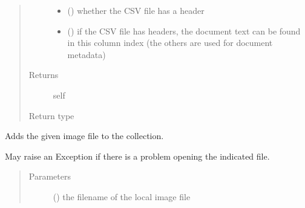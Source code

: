 \documentclass[letterpaper,10pt,english]{sphinxmanual}
\begin{document}
\begin{fulllineitems}
\begin{fulllineitems}
\begin{quote}
\begin{description}
\begin{itemize}
\item {} 
\sphinxAtStartPar
{} () \textendash{} whether the CSV file has a header

\item {} 
\sphinxAtStartPar
{} () \textendash{} if the CSV file has headers, the document text can be found in this column index
(the others are used for document metadata)

\end{itemize}

\item[{Returns}] \leavevmode
\sphinxAtStartPar
self

\item[{Return type}] \leavevmode
\sphinxAtStartPar
{\hyperref[\detokenize{autoapi/pine/client/models/index:pine.client.models.CollectionBuilder}]{}}

\end{description}\end{quote}

\end{fulllineitems}


\begin{fulllineitems}
\label{\detokenize{autoapi/pine/client/index:pine.client.CollectionBuilder.image_file}}
\sphinxAtStartPar
Adds the given image file to the collection.

\sphinxAtStartPar
May raise an Exception if there is a problem opening the indicated file.
\begin{quote}\begin{description}
\item[{Parameters}] \leavevmode
\sphinxAtStartPar
{} () \textendash{} the filename of the local image file


\end{description}
\end{quote}
\end{fulllineitems}
\end{fulllineitems}
\end{document}
